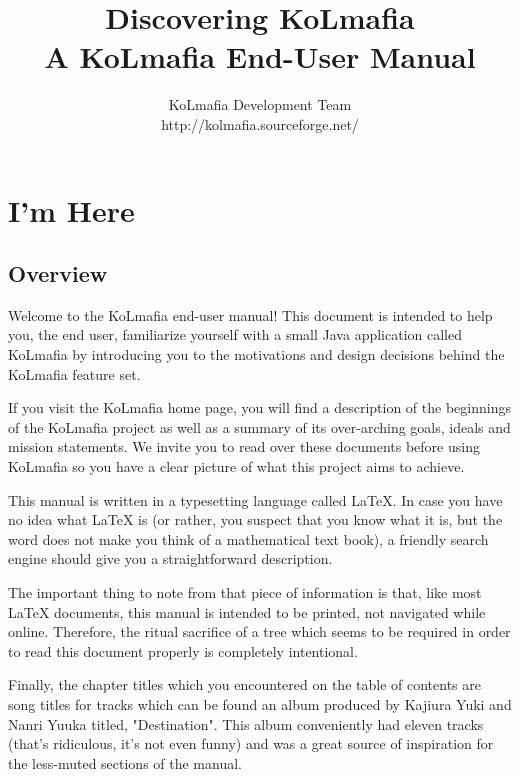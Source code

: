 \documentclass[twocolumn,letterpaper]{report}
\begin{document}
\title{Discovering KoLmafia\\A KoLmafia End-User Manual}
\author{KoLmafia Development Team\\http://kolmafia.sourceforge.net/}
\maketitle

\tableofcontents

\chapter{I'm Here}

\section{Overview}

Welcome to the KoLmafia end-user manual!  This document is intended to help you, the end user, familiarize yourself with a small Java application called KoLmafia by introducing you to the motivations and design decisions behind the KoLmafia feature set.

If you visit the KoLmafia home page, you will find a description of the beginnings of the KoLmafia project as well as a summary of its over-arching goals, ideals and mission statements.  We invite you to read over these documents before using KoLmafia so you have a clear picture of what this project aims to achieve.

This manual is written in a typesetting language called LaTeX.  In case you have no idea what LaTeX is (or rather, you suspect that you know what it is, but the word does not make you think of a mathematical text book), a friendly search engine should give you a straightforward description.

The important thing to note from that piece of information is that, like most LaTeX documents, this manual is intended to be printed, not navigated while online.  Therefore, the ritual sacrifice of a tree which seems to be required in order to read this document properly is completely intentional.

Finally, the chapter titles which you encountered on the table of contents are song titles for tracks which can be found an album produced by Kajiura Yuki and Nanri Yuuka titled, "Destination".  This album conveniently had eleven tracks (that's ridiculous, it's not even funny) and was a great source of inspiration for the less-muted sections of the manual.
\end{document}
